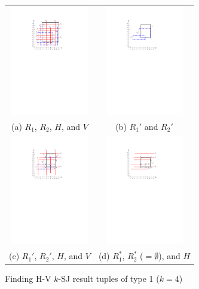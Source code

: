 \documentclass[acmsmall,review,anonymous]{acmart}
\def\figcapup{\vspace{-2mm}}
\def\figcapdown{\vspace{-4mm}}
\begin{document}
\begin{figure}
    \begin{tabular}{cc}
        \includegraphics[height=48mm]{./artwork/alg-ex1-a} &
        \includegraphics[height=48mm]{./artwork/alg-ex1-b} \\
        (a) $R_1$, $R_2$, $H$, and $V$ &
        (b) $R_1'$ and $R_2'$ \\[2mm]
        \includegraphics[height=48mm]{./artwork/alg-ex1-c} &
        \includegraphics[height=48mm]{./artwork/alg-ex1-d} \\
        (c) $R_1'$, $R_2'$, $H$, and $V$ &
        (d) $R_1^*$, $R_2^*$ ($= \emptyset$), and $H$
    \end{tabular}
    \figcapup
    \caption{Finding H-V $k$-SJ result tuples of type 1 ($k = 4$)}
    \label{fig:hv:type1:ex}
    \figcapdown
\end{figure}
\end{document}
